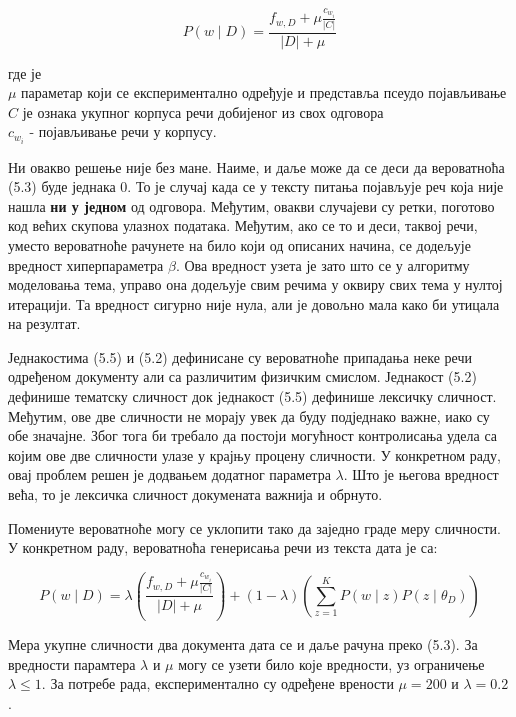 \begin{equation}
P(w \mid D) = \frac{f_{w,D} + \mu\frac{c_{w_i}}{|C|}}{|D|+\mu}
\end{equation}

где је\\
$\mu$ параметар који се експериментално одређује и представља псеудо појављивање\\
$C$ је ознака укупног корпуса речи добијеног из свох одговора
\\
$c_{w_i}$ - појављивање речи у корпусу.

Ни овакво решење није без мане. Наиме, и даље може да се деси да вероватноћа (5.3) буде једнака 0. То је случај када се у тексту питања појављује реч која није нашла \textbf{ни у једном} од одговора. Међутим, овакви случајеви су ретки, поготово код већих скупова улазнох података. Међутим, ако се то и деси, таквој речи, уместо вероватноће рачунете на било који од описаних начина, се додељује вредност хиперпараметра $\beta$. Ова вредност узета је зато што се у алгоритму моделовања тема, управо она додељује свим речима у оквиру свих тема у нултој итерацији. Та вредност сигурно није нула, али је довољно мала како би утицала на резултат.

Једнакостима (5.5) и (5.2) дефинисане су вероватноће припадања неке речи одређеном документу али са различитим физичким смислом. Једнакост (5.2) дефинише тематску сличност док једнакост (5.5) дефинише лексичку сличност. Међутим, ове две сличности не морају увек да буду подједнако важне, иако су обе значајне. Због тога би требало да постоји могућност контролисања удела са којим ове две сличности улазе у крајњу процену сличности. У конкретном раду, овај проблем решен је додвањем додатног параметра $\lambda$. Што је његова вредност већа, то је лексичка сличност докумената важнија и обрнуто.

Помениуте вероватноће могу се уклопити тако да заједно граде меру сличности. У конкретном раду, вероватноћа генерисања речи из текста дата је са:

\begin{equation}
P(w \mid D)  = \lambda(\frac{f_{w,D} + \mu\frac{c_{w_i}}{|C|}}{|D|+\mu}) + (1-\lambda)(\sum_{z=1}^{K} P(w \mid z)P(z \mid \theta_D))
\end{equation}

Мера укупне сличности два документа дата се и даље рачуна преко (5.3).
За вредности парамтера $\lambda$ и $\mu$  могу се узети било које вредности, уз ограничење $\lambda \leq 1$. За потребе рада, експериментално су одређене врености $\mu = 200$ и $\lambda = 0.2$.
